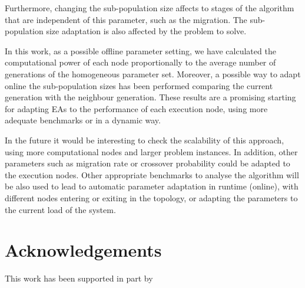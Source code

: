 \documentclass[final,1p,times]{elsarticle}
\begin{document}
Furthermore, changing the sub-population size affects to stages
of the algorithm that are independent of this parameter, such as
the migration. The sub-population size adaptation is also affected by the problem to solve.

In this work, as a possible offline parameter setting, we have calculated the computational power of each node proportionally 
to the average number of generations of the homogeneous parameter set. Moreover, a possible way to adapt 
online the sub-population sizes has been performed comparing the current generation with
 the neighbour generation. These results are a promising starting for adapting EAs to the
performance of each execution node, using more adequate benchmarks or in a dynamic way. 

In the future it would be interesting to check the scalability of this
approach, using more computational nodes and larger problem
instances. In addition, other parameters such as migration rate or
crossover probability could be adapted to the execution
nodes. Other appropriate benchmarks to analyse the algorithm will be also used to lead to automatic
parameter adaptation in runtime (online), with different nodes entering or
exiting in the topology, or adapting the parameters to the current load of the
system. 

\section*{Acknowledgements}
This work has been supported in part by 






\end{document}
